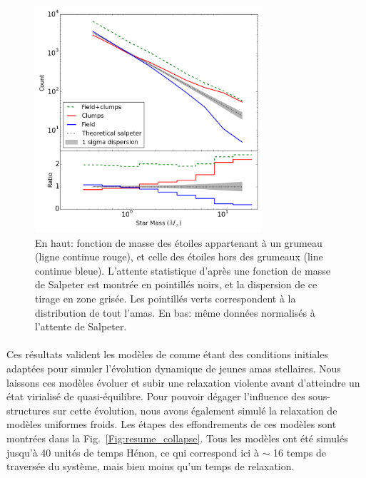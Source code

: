 \begin{figure}
\begin{center}
\includegraphics[width=0.75\textwidth]{Figures/2_ClumpMembers}
\caption{ En haut: fonction de masse des étoiles appartenant à un grumeau (ligne continue rouge), et celle des étoiles hors des grumeaux (line continue bleue). L'attente statistique d'après une fonction de masse de Salpeter est montrée en pointillés noirs, et la dispersion de ce tirage en zone grisée. Les pointillés verts correspondent à la distribution de tout l'amas. En bas: même données normalisés à l'attente de Salpeter.}
\label{Fig:resume_ClumpMembers}
\end{center}
\end{figure}


\paragraph*{}
Ces r\'esultats valident les mod\`eles de \HubLem comme \'etant des conditions initiales adapt\'ees pour simuler l'\'evolution dynamique de jeunes amas stellaires. Nous laissons ces mod\`eles \'evoluer et subir une relaxation violente avant d'atteindre un \'etat virialis\'e de quasi-\'equilibre. Pour pouvoir d\'egager l'influence des sous-structures sur cette \'evolution, nous avons \'egalement simul\'e la relaxation de mod\`eles uniformes froids. Les étapes des effondrements de ces modèles sont montrées dans la Fig.~\ref{Fig:resume_collapse}. Tous les mod\`eles ont \'et\'e simul\'es jusqu'\`a 40 unit\'es de temps H\'enon, ce qui correspond ici \`a $\sim$ 16 temps de travers\'ee du syst\`eme, mais bien moins qu'un temps de relaxation.


